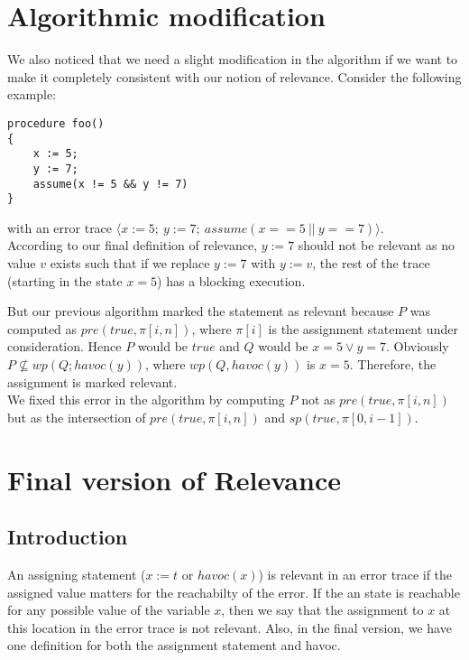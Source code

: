 \documentclass{article}
\newcommand{\trace}[1]{\ensuremath{\langle #1 \rangle}\xspace} %
\begin{document}
\section{Algorithmic modification}
We also noticed that we need a slight modification in the algorithm if we want to make it completely consistent with our notion of relevance. Consider the following example:
\begin{lstlisting}
procedure foo()
{
	x := 5;
	y := 7;
	assume(x != 5 && y != 7)
}
\end{lstlisting}
with an error trace $\trace{x:=5;\ y:=7;\ assume(x==5\ ||\ y==7)}$.
\\ According to our final definition of relevance, $y:=7$ should not be relevant as no value $v$ exists such that if we replace $y:=7$ with $y:=v$, the rest of the trace (starting in the state $x=5$) has a blocking execution. 

But our previous algorithm marked the statement as relevant because $P$ was computed as $pre(true, \pi[i,n])$, where $\pi[i]$ is the assignment statement under consideration. Hence $P$ would be $true$ and $Q$ would be $x=5 \vee y=7$. Obviously $P \not \subseteq wp(Q; havoc(y))$, where $wp(Q, havoc(y))$ is $x=5$. Therefore, the assignment is marked relevant. \\
We fixed this error in the algorithm by computing $P$ not as $pre(true, \pi[i,n])$ but as the intersection of $pre(true, \pi[i,n])$ and $sp(true, \pi[0,i-1])$.




\section{Final version of Relevance}
\subsection{Introduction}
An assigning statement ($x := t$ or $havoc(x)$) is relevant in an error trace if the assigned value matters for the reachabilty of the error. If the an state is reachable for any possible value of the variable $x$, then we say that the assignment to $x$ at this location in the error trace is not relevant. Also, in the final version, we have one definition for both the assignment statement and havoc. 
\end{document}
